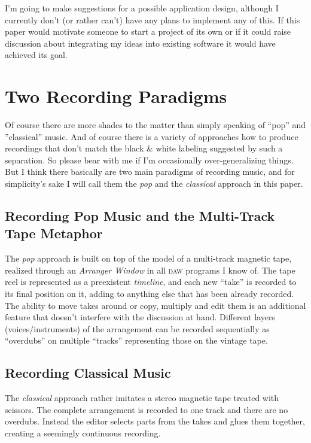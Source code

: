 \documentclass[11pt,a4paper]{article}
\begin{document}
I'm going to make suggestions for a possible application design, although I currently don't (or rather can't) have any plans to implement any of this.
If this paper would motivate someone to start a project of its own or if it could raise discussion about integrating my ideas into existing software it would have achieved its goal.

\section{Two Recording Paradigms}

Of course there are more shades to the matter  than simply speaking of “pop” and ”classical” music.
And of course there is a variety of approaches how to produce recordings that don't match the black \& white labeling suggested by such a separation.
So please bear with me if I'm occasionally over-generalizing things.
But I think there basically are two main paradigms of recording music, and for simplicity's sake I will call them the \emph{pop} and the \emph{classical} approach in this paper.

\subsection{Recording Pop Music and the Multi-Track Tape Metaphor}

The \emph{pop} approach is built on top of the model of a multi-track magnetic tape, realized through an \emph{Arranger Window} in all \textsc{daw} programs I know of.
The tape reel is represented as a preexistent \emph{timeline}, and each new “take” is recorded to its final position on it, adding to anything else that has been already recorded.
The ability to move takes around or copy, multiply and edit them is an additional feature that doesn't interfere with the discussion at hand.
Different layers (voices/instruments) of the arrangement can be recorded sequentially as “overdubs” on multiple “tracks” representing those on the vintage tape.

\subsection{Recording Classical Music}
 
The \emph{classical} approach rather imitates a stereo magnetic tape treated with scissors.
The complete arrangement is recorded to one track and there are no overdubs.
Instead the editor selects parts from the takes and glues them together, creating a seemingly continuous recording.
\end{document}
